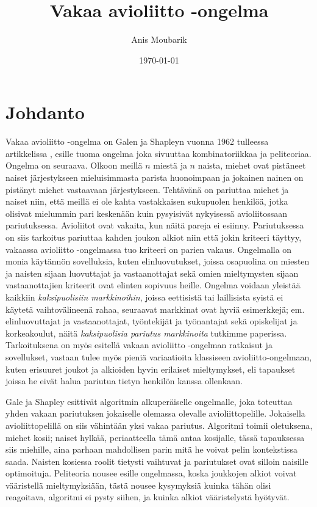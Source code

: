\documentclass[finnish]{tktltiki2}
\title{Vakaa avioliitto -ongelma}
\author{Anis Moubarik}
\date{\today}
\theoremstyle{definition}
\theoremstyle{remark}
\begin{document}

\maketitle        %

\tableofcontents  %
\newpage          %



\section{Johdanto}
Vakaa avioliitto -ongelma on Galen ja Shapleyn vuonna 1962 tulleessa artikkelissa \cite{gale62a}, esille tuoma ongelma joka sivuuttaa kombinatoriikkaa ja peliteoriaa. Ongelma on seuraava. Olkoon meillä $n$ miestä ja $n$ naista, miehet ovat pistäneet naiset järjestykseen mieluisimmasta parista huonoimpaan ja jokainen nainen on pistänyt miehet vastaavaan järjestykseen. Tehtävänä on pariuttaa miehet ja naiset niin, että meillä ei ole kahta vastakkaisen sukupuolen henkilöä, jotka olisivat mielummin pari keskenään kuin pysyisivät nykyisessä avioliitossaan pariutuksessa. Avioliitot ovat vakaita, kun näitä pareja ei esiinny. Pariutuksessa on siis tarkoitus pariuttaa kahden joukon alkiot niin että jokin kriteeri täyttyy, vakaassa avioliitto -ongelmassa tuo kriteeri on parien vakaus.
Ongelmalla on monia käytännön sovelluksia, kuten elinluovutukset, joissa osapuolina on miesten ja naisten sijaan luovuttajat ja vastaanottajat sekä omien mieltymysten sijaan vastaanottajien kriteerit ovat elinten sopivuus heille. Ongelma voidaan yleistää kaikkiin \emph{kaksipuolisiin markkinoihin}, joissa eettisistä tai laillisista syistä ei käytetä vaihtovälineenä rahaa, seuraavat markkinat ovat hyviä esimerkkejä; em. elinluovuttajat ja vastaanottajat, työntekijät ja työnantajat sekä opiskelijat ja korkeakoulut, näitä \emph{kaksipuolisia pariutus markkinoita} tutkimme paperissa. Tarkoituksena on myös esitellä vakaan avioliitto -ongelman ratkaisut ja sovellukset, vastaan tulee myös pieniä variaatioita klassiseen avioliitto-ongelmaan, kuten erisuuret joukot ja alkioiden hyvin erilaiset mieltymykset, eli tapaukset joissa he eivät halua pariutua tietyn henkilön kanssa ollenkaan.

Gale ja Shapley esittivät algoritmin alkuperäiselle ongelmalle, joka toteuttaa yhden vakaan pariutuksen jokaiselle olemassa olevalle avioliittopelille. Jokaisella avioliittopelillä on siis vähintään yksi vakaa pariutus. Algoritmi toimii oletuksena, miehet kosii; naiset hylkää, periaatteella tämä antaa kosijalle, tässä tapauksessa siis miehille, aina parhaan mahdollisen parin mitä he voivat pelin kontekstissa saada. Naisten kosiessa roolit tietysti vaihtuvat ja pariutukset ovat silloin naisille optimoituja.
Peliteoria nousee esille ongelmassa, koska joukkojen alkiot voivat vääristellä mieltymyksiään, tästä nousee kysymyksiä kuinka tähän olisi reagoitava, algoritmi ei pysty siihen, ja kuinka alkiot vääristelystä hyötyvät.
\end{document}
